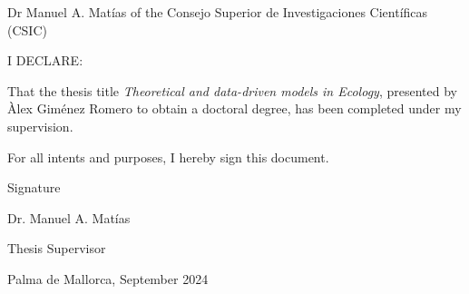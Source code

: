 \thispagestyle{empty}

Dr Manuel A. Matías of the Consejo Superior de Investigaciones
Cient\'ificas (CSIC)

\vspace*{2 cm}

I DECLARE:

\vspace*{1 cm}

That the thesis title \textit{Theoretical and data-driven models in Ecology},
presented by Àlex Giménez Romero to obtain a doctoral degree, has been
completed under my supervision.

\vspace*{2 cm}

For all intents and purposes, I hereby sign this document.

\vspace*{2 cm}

Signature

\vspace*{3 cm}

Dr. Manuel A. Matías

\vspace*{0.1 cm}

Thesis Supervisor

\vspace*{1 cm}

Palma de Mallorca, September 2024

\vfill